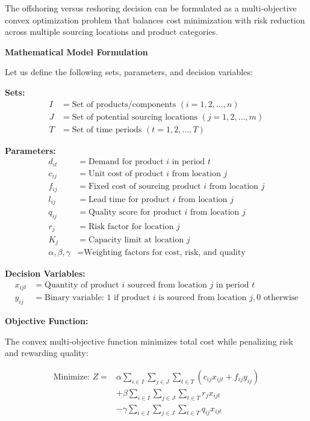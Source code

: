 \documentclass{article}
\begin{document}
The offshoring versus reshoring decision can be formulated as a multi-objective convex optimization problem that balances cost minimization with risk reduction across multiple sourcing locations and product categories.

\textbf{Mathematical Model Formulation}

Let us define the following sets, parameters, and decision variables:

\textbf{Sets:}
\begin{align}
I &= \text{Set of products/components } (i = 1, 2, \ldots, n) \\
J &= \text{Set of potential sourcing locations } (j = 1, 2, \ldots, m) \\
T &= \text{Set of time periods } (t = 1, 2, \ldots, T)
\end{align}

\textbf{Parameters:}
\begin{align}
d_{it} &= \text{Demand for product } i \text{ in period } t \\
c_{ij} &= \text{Unit cost of product } i \text{ from location } j \\
f_{ij} &= \text{Fixed cost of sourcing product } i \text{ from location } j \\
l_{ij} &= \text{Lead time for product } i \text{ from location } j \\
q_{ij} &= \text{Quality score for product } i \text{ from location } j \\
r_{j} &= \text{Risk factor for location } j \\
K_{j} &= \text{Capacity limit at location } j \\
\alpha, \beta, \gamma &= \text{Weighting factors for cost, risk, and quality}
\end{align}

\textbf{Decision Variables:}
\begin{align}
x_{ijt} &= \text{Quantity of product } i \text{ sourced from location } j \text{ in period } t \\
y_{ij} &= \text{Binary variable: 1 if product } i \text{ is sourced from location } j, 0 \text{ otherwise}
\end{align}

\textbf{Objective Function:}

The convex multi-objective function minimizes total cost while penalizing risk and rewarding quality:

\begin{align}
\text{Minimize: } Z = &\alpha \sum_{i \in I} \sum_{j \in J} \sum_{t \in T} (c_{ij} x_{ijt} + f_{ij} y_{ij}) \\
&+ \beta \sum_{i \in I} \sum_{j \in J} \sum_{t \in T} r_j x_{ijt} \\
&- \gamma \sum_{i \in I} \sum_{j \in J} \sum_{t \in T} q_{ij} x_{ijt}
\end{align}
\end{document}
